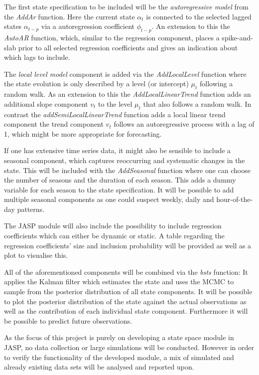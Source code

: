\documentclass[a4paper, doc, natbib]{apa7}
\begin{document}
The first state specification to be included will be the \textit{autoregressive model} from the \textit{AddAr} function. Here the current state $\alpha_t$ is connected to the selected lagged states $\alpha_{t-p}$ via a autoregression coefficient $\phi_{t-p}$. An extension to this the \textit{AutoAR} function, which, similar to the regression component, places a spike-and-slab prior to all selected regression coefficients and gives an indication about which lags to include.

The \textit{local level model} component is added via the \textit{AddLocalLevel} function where the state evolution is only described by a level (or intercept) $\mu_t$ following a random walk. As an extension to this the \textit{AddLocalLinearTrend} function adds an additional slope component $v_t$  to the level $\mu_t$ that also follows a random walk. In contrast the \textit{addSemiLocalLinearTrend} function adds a local linear trend component the trend component $v_t$ follows an autoregressive process with a lag of 1, which might be more appropriate for forecasting. 

If one has extensive time series data, it might also be sensible to include a seasonal component, which captures reoccurring and systematic changes in the state. This will be included with the \textit{AddSeasonal} function where one can choose the number of seasons and the duration of each season. This adds a dummy variable for each season to the state specification. It will be possible to add multiple seasonal components as one could suspect weekly, daily and hour-of-the-day patterns. 

The JASP module will also include the possibility to include regression coefficients which can either be dynamic or static. A table regarding the regression coefficients' size and inclusion probability will be provided as well as a plot to visualise this. 

All of the aforementioned components will be combined via the \textit{bsts} function: It applies the Kalman filter which estimates the state and uses the MCMC to sample from the posterior distribution of all state components. It will be possible to plot the posterior distribution of the state against the actual observations as well as the contribution of each individual state component. Furthermore it will be possible to predict future observations. 

As the focus of this project is purely on developing a state space module in JASP, no data collection or large simulations will be conducted. However in order to verify the functionality of the developed module, a mix of simulated and already existing data sets will be analysed and reported upon. 
\end{document}
